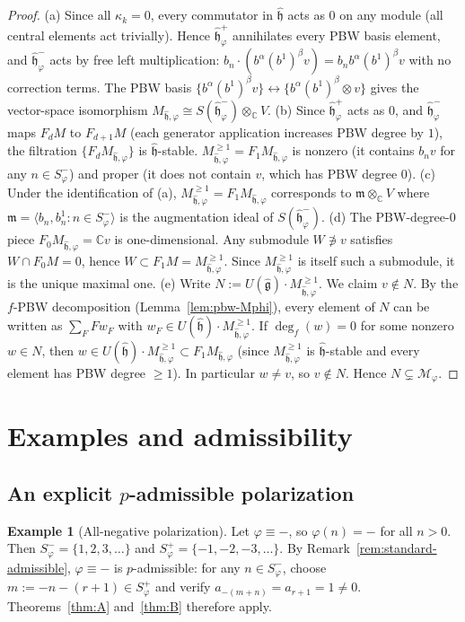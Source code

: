 \documentclass{amsart}
\newcommand{\Cx}{\mathbb{C}}
\newcommand{\g}{\mathfrak{g}}
\newcommand{\h}{\mathfrak{h}}
\newcommand{\wh}[1]{\widehat{#1}}
\newcommand{\whg}{\wh{\g}}
\newcommand{\whh}{\wh{\h}}
\theoremstyle{definition}
\newtheorem{example}[theorem]{Example}
\theoremstyle{remark}
\numberwithin{equation}{section}
\begin{document}
\begin{proof}
(a) Since all $\kappa_k=0$, every commutator in $\whh$ acts as $0$ on any
module (all central elements act trivially).  Hence $\whh_\varphi^+$
annihilates every PBW basis element, and $\whh_\varphi^-$ acts by free
left multiplication: $b_n\cdot(b^\alpha(b^1)^\beta v)=b_n b^\alpha(b^1)^\beta v$
with no correction terms.  The PBW basis
$\{b^\alpha(b^1)^\beta v\}\leftrightarrow\{b^\alpha(b^1)^\beta\otimes v\}$
gives the vector-space isomorphism
$M_{\whh,\varphi}\cong S(\whh_\varphi^-)\otimes_\Cx V$.
(b) Since $\whh_\varphi^+$ acts as $0$, and $\whh_\varphi^-$ maps
$F_dM$ to $F_{d+1}M$ (each generator application increases PBW degree
by $1$), the filtration $\{F_dM_{\whh,\varphi}\}$ is $\whh$-stable.
$M_{\whh,\varphi}^{\ge1}=F_1M_{\whh,\varphi}$ is nonzero (it contains
$b_n v$ for any $n\in S_\varphi^-$) and proper (it does not contain $v$,
which has PBW degree $0$).
(c) Under the identification of (a),
$M_{\whh,\varphi}^{\ge1}=F_1M_{\whh,\varphi}$ corresponds to
$\mathfrak{m}\otimes_\Cx V$ where $\mathfrak{m}=\langle b_n,b_n^1:
n\in S_\varphi^-\rangle$ is the augmentation ideal of $S(\whh_\varphi^-)$.
(d) The PBW-degree-$0$ piece $F_0M_{\whh,\varphi}=\Cx v$ is
one-dimensional.  Any submodule $W\not\ni v$ satisfies
$W\cap F_0M=0$, hence $W\subset F_1M=M_{\whh,\varphi}^{\ge1}$.
Since $M_{\whh,\varphi}^{\ge1}$ is itself such a submodule, it is
the unique maximal one.
(e) Write $N:=U(\whg)\cdot M_{\whh,\varphi}^{\ge1}$.
We claim $v\notin N$.  By the $f$-PBW decomposition
(Lemma~\ref{lem:pbw-Mphi}), every element of $N$ can be written as
$\sum_F Fw_F$ with $w_F\in U(\whh)\cdot M_{\whh,\varphi}^{\ge1}$.
If $\deg_f(w)=0$ for some nonzero $w\in N$, then
$w\in U(\whh)\cdot M_{\whh,\varphi}^{\ge1}\subset F_1M_{\whh,\varphi}$
(since $M_{\whh,\varphi}^{\ge1}$ is $\whh$-stable and every element
has PBW degree $\ge1$).  In particular $w\neq v$, so $v\notin N$.
Hence $N\subsetneq\mathcal M_\varphi$.
\end{proof}
\section{Examples and admissibility}\label{sec:examples}
\subsection{An explicit $p$-admissible polarization}
\begin{example}[All-negative polarization]\label{ex:all-minus}
Let $\varphi\equiv-$, so $\varphi(n)=-$ for all $n>0$.
Then $S_\varphi^-=\{1,2,3,\dots\}$ and $S_\varphi^+=\{-1,-2,-3,\dots\}$.
By Remark~\ref{rem:standard-admissible}, $\varphi\equiv-$ is
$p$-admissible: for any $n\in S_\varphi^-$, choose $m:=-n-(r+1)\in S_\varphi^+$
and verify $a_{-(m+n)}=a_{r+1}=1\neq0$.
Theorems~\ref{thm:A} and~\ref{thm:B} therefore apply.
\end{example}
\end{document}
